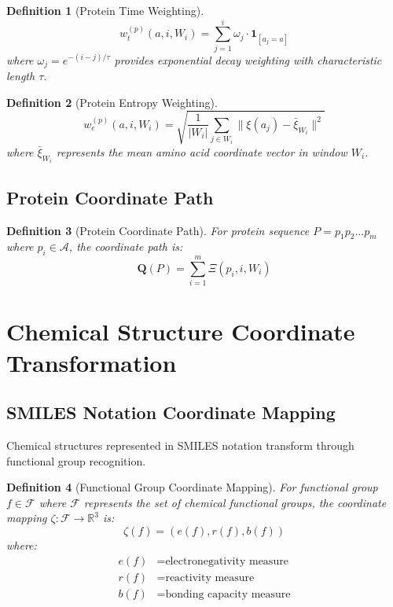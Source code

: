\documentclass[12pt,a4paper]{article}
\newtheorem{definition}{Definition}
\begin{document}
\begin{definition}[Protein Time Weighting]
$$w_t^{(p)}(a,i,W_i) = \sum_{j=1}^{i} \omega_j \cdot \mathbf{1}_{[a_j = a]}$$
where $\omega_j = e^{-(i-j)/\tau}$ provides exponential decay weighting with characteristic length $\tau$.
\end{definition}

\begin{definition}[Protein Entropy Weighting]
$$w_e^{(p)}(a,i,W_i) = \sqrt{\frac{1}{|W_i|} \sum_{j \in W_i} \|\xi(a_j) - \bar{\xi}_{W_i}\|^2}$$
where $\bar{\xi}_{W_i}$ represents the mean amino acid coordinate vector in window $W_i$.
\end{definition}

\subsection{Protein Coordinate Path}

\begin{definition}[Protein Coordinate Path]
For protein sequence $P = p_1p_2...p_m$ where $p_i \in \mathcal{A}$, the coordinate path is:
$$\mathbf{Q}(P) = \sum_{i=1}^m \Xi(p_i, i, W_i)$$
\end{definition}

\section{Chemical Structure Coordinate Transformation}

\subsection{SMILES Notation Coordinate Mapping}

Chemical structures represented in SMILES notation transform through functional group recognition.

\begin{definition}[Functional Group Coordinate Mapping]
For functional group $f \in \mathcal{F}$ where $\mathcal{F}$ represents the set of chemical functional groups, the coordinate mapping $\zeta: \mathcal{F} \rightarrow \mathbb{R}^3$ is:
$$\zeta(f) = (e(f), r(f), b(f))$$
where:
\begin{align}
e(f) &= \text{electronegativity measure} \\
r(f) &= \text{reactivity measure} \\
b(f) &= \text{bonding capacity measure}
\end{align}
\end{definition}
\end{document}
